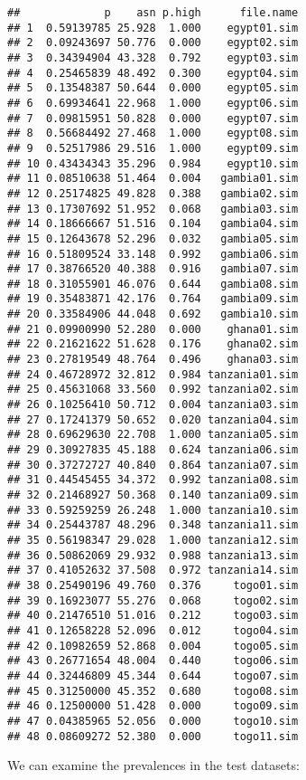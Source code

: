 \documentclass[
  12pt,
  a4paper]{book}
\newenvironment{Shaded}{\begin{snugshade}}{\end{snugshade}}
\newcommand{\AttributeTok}[1]{\textcolor[rgb]{0.77,0.63,0.00}{#1}}
\newcommand{\FunctionTok}[1]{\textcolor[rgb]{0.00,0.00,0.00}{#1}}
\newcommand{\NormalTok}[1]{#1}
\newcommand{\SpecialCharTok}[1]{\textcolor[rgb]{0.00,0.00,0.00}{#1}}
\newcommand{\StringTok}[1]{\textcolor[rgb]{0.31,0.60,0.02}{#1}}
\begin{document}
\begin{verbatim}
##             p    asn p.high      file.name
## 1  0.59139785 25.928  1.000    egypt01.sim
## 2  0.09243697 50.776  0.000    egypt02.sim
## 3  0.34394904 43.328  0.792    egypt03.sim
## 4  0.25465839 48.492  0.300    egypt04.sim
## 5  0.13548387 50.644  0.000    egypt05.sim
## 6  0.69934641 22.968  1.000    egypt06.sim
## 7  0.09815951 50.828  0.000    egypt07.sim
## 8  0.56684492 27.468  1.000    egypt08.sim
## 9  0.52517986 29.516  1.000    egypt09.sim
## 10 0.43434343 35.296  0.984    egypt10.sim
## 11 0.08510638 51.464  0.004   gambia01.sim
## 12 0.25174825 49.828  0.388   gambia02.sim
## 13 0.17307692 51.952  0.068   gambia03.sim
## 14 0.18666667 51.516  0.104   gambia04.sim
## 15 0.12643678 52.296  0.032   gambia05.sim
## 16 0.51809524 33.148  0.992   gambia06.sim
## 17 0.38766520 40.388  0.916   gambia07.sim
## 18 0.31055901 46.076  0.644   gambia08.sim
## 19 0.35483871 42.176  0.764   gambia09.sim
## 20 0.33584906 44.048  0.692   gambia10.sim
## 21 0.09900990 52.280  0.000    ghana01.sim
## 22 0.21621622 51.628  0.176    ghana02.sim
## 23 0.27819549 48.764  0.496    ghana03.sim
## 24 0.46728972 32.812  0.984 tanzania01.sim
## 25 0.45631068 33.560  0.992 tanzania02.sim
## 26 0.10256410 50.712  0.004 tanzania03.sim
## 27 0.17241379 50.652  0.020 tanzania04.sim
## 28 0.69629630 22.708  1.000 tanzania05.sim
## 29 0.30927835 45.188  0.624 tanzania06.sim
## 30 0.37272727 40.840  0.864 tanzania07.sim
## 31 0.44545455 34.372  0.992 tanzania08.sim
## 32 0.21468927 50.368  0.140 tanzania09.sim
## 33 0.59259259 26.248  1.000 tanzania10.sim
## 34 0.25443787 48.296  0.348 tanzania11.sim
## 35 0.56198347 29.028  1.000 tanzania12.sim
## 36 0.50862069 29.932  0.988 tanzania13.sim
## 37 0.41052632 37.508  0.972 tanzania14.sim
## 38 0.25490196 49.760  0.376     togo01.sim
## 39 0.16923077 55.276  0.068     togo02.sim
## 40 0.21476510 51.016  0.212     togo03.sim
## 41 0.12658228 52.096  0.012     togo04.sim
## 42 0.10982659 52.868  0.004     togo05.sim
## 43 0.26771654 48.004  0.440     togo06.sim
## 44 0.32446809 45.344  0.644     togo07.sim
## 45 0.31250000 45.352  0.680     togo08.sim
## 46 0.12500000 51.428  0.000     togo09.sim
## 47 0.04385965 52.056  0.000     togo10.sim
## 48 0.08609272 52.380  0.000     togo11.sim
\end{verbatim}

We can examine the prevalences in the test datasets:

\begin{Shaded}
\end{Shaded}
\end{document}
